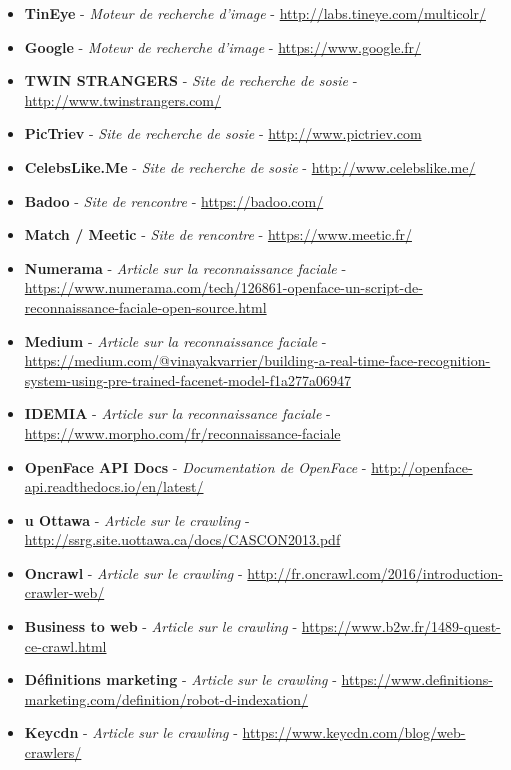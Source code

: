 \documentclass[a4paper,12pt]{article}
\begin{document}
\begin{itemize}
    \item \textbf{TinEye} - \textit{Moteur de recherche d'image} -         \url{http://labs.tineye.com/multicolr/}
    \item \textbf{Google} - \textit{Moteur de recherche d'image} - \url{https://www.google.fr/}
    \item \textbf{TWIN STRANGERS} - \textit{Site de recherche de sosie} - \url{http://www.twinstrangers.com/}
    \item \textbf{PicTriev} - \textit{Site de recherche de sosie} - \url{http://www.pictriev.com}
    \item \textbf{CelebsLike.Me} - \textit{Site de recherche de sosie} - \url{http://www.celebslike.me/}
    \item \textbf{Badoo} - \textit{Site de rencontre} - \url{https://badoo.com/}
    \item \textbf{Match / Meetic} - \textit{Site de rencontre} - \url{https://www.meetic.fr/}
    \item \textbf{Numerama} - \textit{Article sur la reconnaissance faciale} - \url{https://www.numerama.com/tech/126861-openface-un-script-de-reconnaissance-faciale-open-source.html}
    \item \textbf{Medium} - \textit{Article sur la reconnaissance faciale} - \url{https://medium.com/@vinayakvarrier/building-a-real-time-face-recognition-system-using-pre-trained-facenet-model-f1a277a06947 }
    \item \textbf{IDEMIA } - \textit{Article sur la reconnaissance faciale } - \url{https://www.morpho.com/fr/reconnaissance-faciale }
    \item \textbf{OpenFace API Docs} - \textit{Documentation de OpenFace} - \url{http://openface-api.readthedocs.io/en/latest/}
    \item \textbf{u Ottawa } - \textit{Article sur le crawling} - \url{http://ssrg.site.uottawa.ca/docs/CASCON2013.pdf }
    \item \textbf{Oncrawl } - \textit{Article sur le crawling } - \url{http://fr.oncrawl.com/2016/introduction-crawler-web/}
    \item \textbf{Business to web } - \textit{Article sur le crawling } - \url{https://www.b2w.fr/1489-quest-ce-crawl.html}
    \item \textbf{Définitions marketing } - \textit{Article sur le crawling } - \url{https://www.definitions-marketing.com/definition/robot-d-indexation/ }
    \item \textbf{Keycdn } - \textit{Article sur le crawling} - \url{https://www.keycdn.com/blog/web-crawlers/}

\end{itemize}
\end{document}
